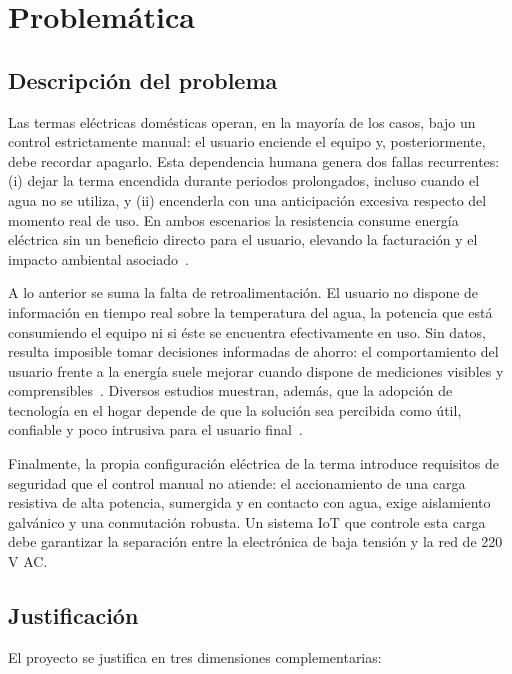 \documentclass[11pt,a4paper]{article}
\begin{document}
\section{Problemática}
\label{sec:problematica}

\subsection*{Descripción del problema}
Las termas eléctricas domésticas operan, en la mayoría de los casos, bajo un control estrictamente manual: el usuario enciende el equipo y, posteriormente, debe recordar apagarlo. Esta dependencia humana genera dos fallas recurrentes: (i) dejar la terma encendida durante periodos prolongados, incluso cuando el agua no se utiliza, y (ii) encenderla con una anticipación excesiva respecto del momento real de uso. En ambos escenarios la resistencia consume energía eléctrica sin un beneficio directo para el usuario, elevando la facturación y el impacto ambiental asociado~\cite{bhati2017}.

A lo anterior se suma la falta de retroalimentación. El usuario no dispone de información en tiempo real sobre la temperatura del agua, la potencia que está consumiendo el equipo ni si éste se encuentra efectivamente en uso. Sin datos, resulta imposible tomar decisiones informadas de ahorro: el comportamiento del usuario frente a la energía suele mejorar cuando dispone de mediciones visibles y comprensibles~\cite{zipperer2013,ford2017}. Diversos estudios muestran, además, que la adopción de tecnología en el hogar depende de que la solución sea percibida como útil, confiable y poco intrusiva para el usuario final~\cite{marikyan2019}.

Finalmente, la propia configuración eléctrica de la terma introduce requisitos de seguridad que el control manual no atiende: el accionamiento de una carga resistiva de alta potencia, sumergida y en contacto con agua, exige aislamiento galvánico y una conmutación robusta. Un sistema IoT que controle esta carga debe garantizar la separación entre la electrónica de baja tensión y la red de 220 V AC.

\subsection*{Justificación}
El proyecto se justifica en tres dimensiones complementarias:
\end{document}
